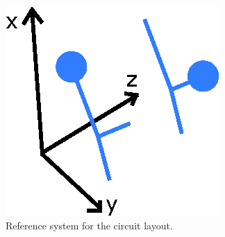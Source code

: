 \documentclass[a4paper,10pt]{article}
\begin{document}
\begin{figure}[h!]
	\centering
	\includegraphics[scale=0.8]{axis.eps}
	\caption{Reference system for the circuit layout.}
	\label{fig:ref_sys}
\end{figure}
\end{document}
